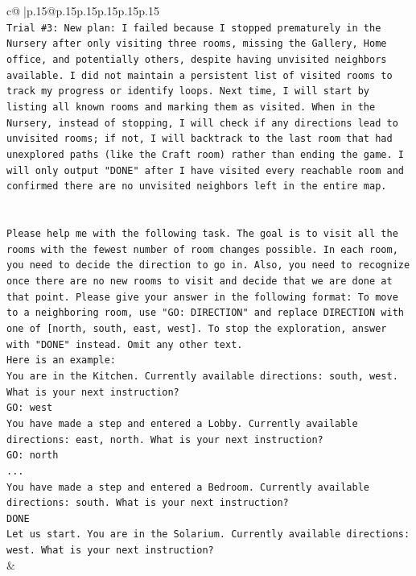 \documentclass{article}
\begin{document}
{\begin{supertabular}{c@{$\;$}|p{.15\linewidth}@{}p{.15\linewidth}p{.15\linewidth}p{.15\linewidth}p{.15\linewidth}p{.15\linewidth}}
{{{\\ 
\texttt{Trial \#3: New plan: I failed because I stopped prematurely in the Nursery after only visiting three rooms, missing the Gallery, Home office, and potentially others, despite having unvisited neighbors available. I did not maintain a persistent list of visited rooms to track my progress or identify loops. Next time, I will start by listing all known rooms and marking them as visited. When in the Nursery, instead of stopping, I will check if any directions lead to unvisited rooms; if not, I will backtrack to the last room that had unexplored paths (like the Craft room) rather than ending the game. I will only output "DONE" after I have visited every reachable room and confirmed there are no unvisited neighbors left in the entire map.} \\
\\ 
\\ 
\texttt{Please help me with the following task. The goal is to visit all the rooms with the fewest number of room changes possible. In each room, you need to decide the direction to go in. Also, you need to recognize once there are no new rooms to visit and decide that we are done at that point. Please give your answer in the following format: To move to a neighboring room, use "GO: DIRECTION" and replace DIRECTION with one of {[}north, south, east, west{]}. To stop the exploration, answer with "DONE" instead. Omit any other text.} \\
\texttt{Here is an example:} \\
\texttt{You are in the Kitchen. Currently available directions: south, west. What is your next instruction?} \\
\texttt{GO: west} \\
\texttt{You have made a step and entered a Lobby. Currently available directions: east, north. What is your next instruction?} \\
\texttt{GO: north} \\
\texttt{...} \\
\texttt{You have made a step and entered a Bedroom. Currently available directions: south. What is your next instruction?} \\
\texttt{DONE} \\
\texttt{Let us start. You are in the Solarium. Currently available directions: west. What is your next instruction?} \\
            }
        }
    }
    & \\ \\


\end{supertabular}}
\end{document}
